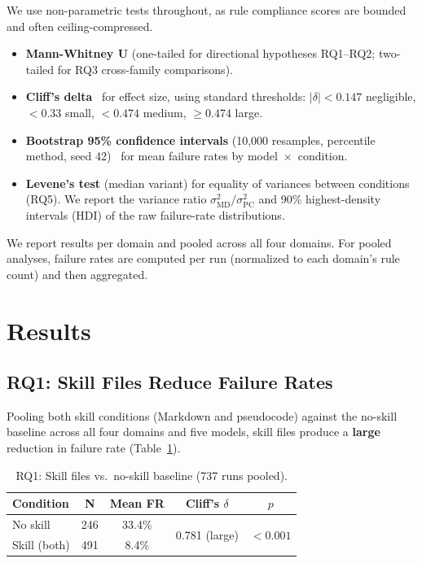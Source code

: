 \documentclass[sigconf,nonacm]{acmart}
\begin{document}
We use non-parametric tests throughout, as rule compliance scores are bounded
and often ceiling-compressed.

\begin{itemize}
  \item \textbf{Mann-Whitney U} (one-tailed for directional hypotheses
    RQ1--RQ2; two-tailed for RQ3 cross-family comparisons).
  \item \textbf{Cliff's delta}~\cite{cliff1993dominance} for effect size,
    using standard thresholds: $|\delta| < 0.147$ negligible,
    $< 0.33$ small, $< 0.474$ medium, $\geq 0.474$ large.
  \item \textbf{Bootstrap 95\% confidence intervals} (10,000 resamples,
    percentile method, seed 42)~\cite{efron1994bootstrap} for mean failure
    rates by model~$\times$~condition.
  \item \textbf{Levene's test} (median variant) for equality of variances
    between conditions (RQ5). We report the variance ratio
    $\sigma^2_{\text{MD}} / \sigma^2_{\text{PC}}$ and 90\% highest-density
    intervals (HDI) of the raw failure-rate distributions.
\end{itemize}

We report results per domain and pooled across all four domains. For pooled
analyses, failure rates are computed per run (normalized to each domain's rule
count) and then aggregated.



\section{Results}\label{sec:results}

\subsection{RQ1: Skill Files Reduce Failure Rates}\label{sec:rq1}

Pooling both skill conditions (Markdown and pseudocode) against the no-skill
baseline across all four domains and five models, skill files produce a
\textbf{large} reduction in failure rate (Table~\ref{tab:rq1}).

\begin{table}[t]
\caption{RQ1: Skill files vs.\ no-skill baseline (737 runs pooled).}
\label{tab:rq1}
\centering\small
\begin{tabular}{lcccc}
\toprule
\textbf{Condition} & \textbf{N} & \textbf{Mean FR} & \textbf{Cliff's $\delta$} & \textbf{$p$} \\
\midrule
No skill & 246 & 33.4\% & \multirow{2}{*}{0.781 (large)} & \multirow{2}{*}{$< 0.001$} \\
Skill (both) & 491 & 8.4\% & & \\
\bottomrule
\end{tabular}
\end{table}
\end{document}

